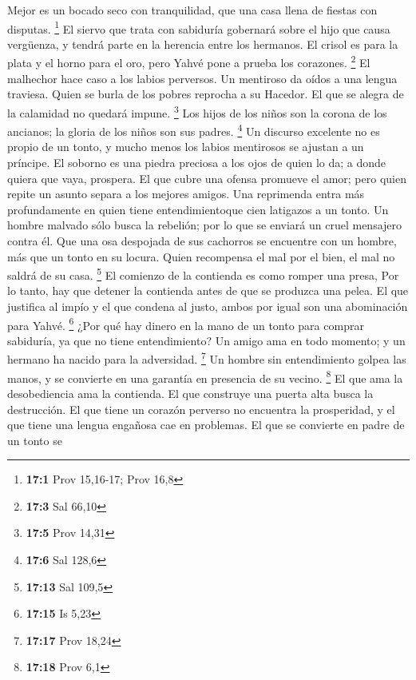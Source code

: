  Mejor es un bocado seco con tranquilidad, que una casa
llena de fiestas con disputas. \footnote{\textbf{17:1} Prov 15,16-17;
  Prov 16,8}  El siervo que trata con sabiduría gobernará
sobre el hijo que causa vergüenza, y tendrá parte en la herencia entre
los hermanos.  El crisol es para la plata y el horno para
el oro, pero Yahvé pone a prueba los corazones. \footnote{\textbf{17:3}
  Sal 66,10}  El malhechor hace caso a los labios
perversos. Un mentiroso da oídos a una lengua traviesa. 
Quien se burla de los pobres reprocha a su Hacedor. El que se alegra de
la calamidad no quedará impune. \footnote{\textbf{17:5} Prov 14,31}
 Los hijos de los niños son la corona de los ancianos; la
gloria de los niños son sus padres. \footnote{\textbf{17:6} Sal 128,6}
 Un discurso excelente no es propio de un tonto, y mucho
menos los labios mentirosos se ajustan a un príncipe.  El
soborno es una piedra preciosa a los ojos de quien lo da; a donde quiera
que vaya, prospera.  El que cubre una ofensa promueve el
amor; pero quien repite un asunto separa a los mejores amigos.
 Una reprimenda entra más profundamente en quien tiene
entendimientoque cien latigazos a un tonto.  Un hombre
malvado sólo busca la rebelión; por lo que se enviará un cruel mensajero
contra él.  Que una osa despojada de sus cachorros se
encuentre con un hombre, más que un tonto en su locura. 
Quien recompensa el mal por el bien, el mal no saldrá de su casa.
\footnote{\textbf{17:13} Sal 109,5}  El comienzo de la
contienda es como romper una presa, Por lo tanto, hay que detener la
contienda antes de que se produzca una pelea.  El que
justifica al impío y el que condena al justo, ambos por igual son una
abominación para Yahvé. \footnote{\textbf{17:15} Is 5,23}
 ¿Por qué hay dinero en la mano de un tonto para comprar
sabiduría, ya que no tiene entendimiento?  Un amigo ama
en todo momento; y un hermano ha nacido para la adversidad. \footnote{\textbf{17:17}
  Prov 18,24}  Un hombre sin entendimiento golpea las
manos, y se convierte en una garantía en presencia de su vecino.
\footnote{\textbf{17:18} Prov 6,1}  El que ama la
desobediencia ama la contienda. El que construye una puerta alta busca
la destrucción.  El que tiene un corazón perverso no
encuentra la prosperidad, y el que tiene una lengua engañosa cae en
problemas.  El que se convierte en padre de un tonto se
